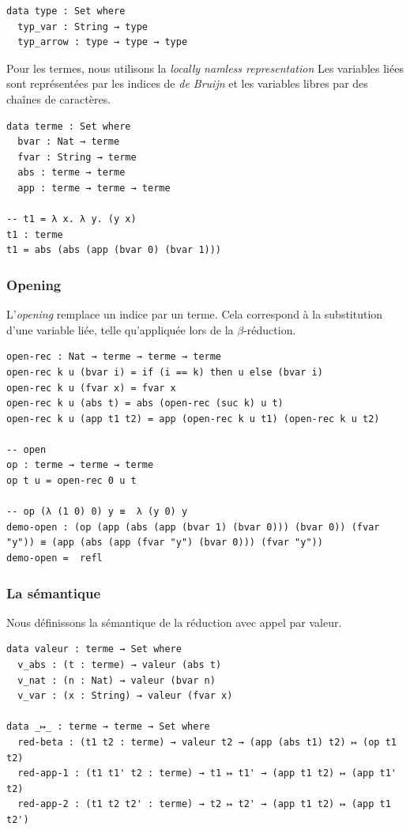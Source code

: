 \begin{Verbatim}
data type : Set where
  typ_var : String → type
  typ_arrow : type → type → type
\end{Verbatim}

Pour les termes, nous utilisons la \textit{locally namless representation}
Les variables liées sont représentées par les indices de \textit{de Bruijn} et les variables 
libres par des chaînes de caractères.
\begin{Verbatim}
data terme : Set where
  bvar : Nat → terme
  fvar : String → terme
  abs : terme → terme
  app : terme → terme → terme

-- t1 = λ x. λ y. (y x)
t1 : terme
t1 = abs (abs (app (bvar 0) (bvar 1)))
\end{Verbatim}


\subsubsection{Opening}
L'\textit{opening} remplace un indice par un terme. 
Cela correspond à la substitution d'une variable liée, telle qu'appliquée lors de la 
$\beta$-réduction.

\begin{Verbatim}
open-rec : Nat → terme → terme → terme
open-rec k u (bvar i) = if (i == k) then u else (bvar i)
open-rec k u (fvar x) = fvar x
open-rec k u (abs t) = abs (open-rec (suc k) u t)
open-rec k u (app t1 t2) = app (open-rec k u t1) (open-rec k u t2)

-- open
op : terme → terme → terme
op t u = open-rec 0 u t

-- op (λ (1 0) 0) y ≡  λ (y 0) y
demo-open : (op (app (abs (app (bvar 1) (bvar 0))) (bvar 0)) (fvar "y")) ≡ (app (abs (app (fvar "y") (bvar 0))) (fvar "y"))
demo-open =  refl
\end{Verbatim}

\subsubsection{La sémantique} 
Nous définissons la sémantique de la réduction avec appel par valeur.

\begin{Verbatim}
data valeur : terme → Set where
  v_abs : (t : terme) → valeur (abs t)
  v_nat : (n : Nat) → valeur (bvar n)
  v_var : (x : String) → valeur (fvar x)

data _↦_ : terme → terme → Set where
  red-beta : (t1 t2 : terme) → valeur t2 → (app (abs t1) t2) ↦ (op t1 t2)
  red-app-1 : (t1 t1' t2 : terme) → t1 ↦ t1' → (app t1 t2) ↦ (app t1' t2)
  red-app-2 : (t1 t2 t2' : terme) → t2 ↦ t2' → (app t1 t2) ↦ (app t1 t2')
\end{Verbatim}

